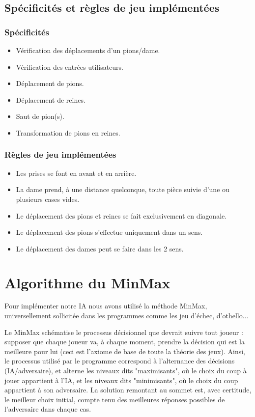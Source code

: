 \documentclass[10pt,a4paper]{report}
\begin{document}
	\subsection{Spécificités et règles de jeu implémentées}
		\subsubsection{Spécificités}
		
		\begin{itemize}[label = $\blacktriangleright$]
		\item Vérification des déplacements d'un pions/dame.
		\item Vérification des entrées utilisateurs.
		\item Déplacement de pions.
		\item Déplacement de reines.
		\item Saut de pion(s).
		\item Transformation de pions en reines.
		\end{itemize}
		
		\subsubsection{Règles de jeu implémentées}
		
		\begin{itemize}[label = $\blacktriangleright$]
		\item Les prises se font en avant et en arrière.
		\item La dame prend, à une distance quelconque, toute pièce suivie d'une ou plusieurs cases vides.
		\item Le déplacement des pions et reines se fait exclusivement en diagonale.
		\item Le déplacement des pions s'effectue uniquement dans un sens.
		\item Le déplacement des dames peut se faire dans les 2 sens. 
		\end{itemize}
\section{Algorithme du MinMax}
	Pour implémenter notre IA nous avons utilisé la méthode MinMax, universellement sollicitée dans les programmes comme les jeu d'échec, d'othello...

Le MinMax schématise le processus décisionnel que devrait suivre tout joueur : supposer que chaque joueur va, à chaque moment, prendre la décision qui est la meilleure pour lui (ceci est l'axiome de base de toute la théorie des jeux). 
Ainsi, le processus utilisé par le programme correspond à l'alternance des décisions (IA/adversaire), et alterne les niveaux dits "maximisants", où le choix du coup à jouer appartient à l'IA, et les niveaux dits "minimisants", où le choix du coup appartient à son adversaire. La solution remontant au sommet est, avec certitude, le meilleur choix initial, compte tenu des meilleures réponses possibles de l'adversaire dans chaque cas.
\end{document}
